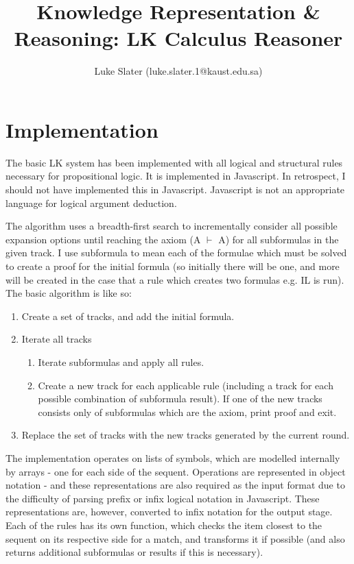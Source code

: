 \documentclass{article}
\begin{document}
\setlength{\parskip}{\medskipamount}
\setlength{\parindent}{0pt}

\title{Knowledge Representation \& Reasoning: LK Calculus Reasoner}
\author{Luke Slater (luke.slater.1@kaust.edu.sa)}

\maketitle

\pagebreak

\section{Implementation}

The basic LK system has been implemented with all logical and structural rules
necessary for propositional logic. It is implemented in
Javascript. In retrospect, I should not have implemented this in Javascript. Javascript is not an appropriate language for logical argument
deduction.

The algorithm uses a breadth-first search to incrementally consider all possible
expansion options until reaching the axiom (A $\vdash$ A) for all subformulas in
the given track. I use subformula to mean each of the formulae which must be
solved to create a proof for the initial formula (so initially there will be
one, and more will be created in the case that a rule which creates two formulas
e.g. IL is run). The basic algorithm is like so:

\begin{enumerate}
  \item Create a set of tracks, and add the initial formula.
  \item Iterate all tracks
    \begin{enumerate}
      \item Iterate subformulas and apply all rules.
      \item Create a new track for each applicable rule (including a track for each 
      possible combination of subformula result). If one of the new tracks
      consists only of subformulas which are the axiom, print proof and exit.
    \end{enumerate}
  \item Replace the set of tracks with the new tracks generated by the current
  round.
\end{enumerate}

The implementation operates on lists of symbols, which are modelled internally
by arrays - one for each side of the sequent. Operations are represented in
object notation - and these representations are also required as the input
format due to the difficulty of parsing prefix or infix logical notation in
Javascript. These representations are, however, converted to infix notation for
the output stage. Each of the rules has its own function, which checks the item
closest to the sequent on its respective side for a match, and transforms it if
possible (and also returns additional subformulas or results if this is
necessary).
\end{document}
